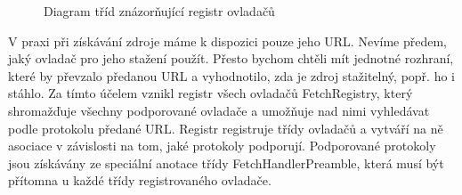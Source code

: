 \begin{figure}[H]
  \begin{center}
    \caption{Diagram tříd znázorňující registr ovladačů}
    \label{Figure.FetchRegistry}
  \end{center}
\end{figure}

V praxi při získávání zdroje máme k dispozici pouze jeho URL. Nevíme předem, jaký ovladač pro jeho stažení použít. Přesto bychom chtěli mít jednotné rozhraní, které by převzalo předanou URL a vyhodnotilo, zda je zdroj stažitelný, popř. ho i stáhlo. Za tímto účelem vznikl registr všech ovladačů FetchRegistry, který shromažďuje všechny podporované ovladače a umožňuje nad nimi vyhledávat podle protokolu předané URL. Registr registruje třídy ovladačů a vytváří na ně asociace v závislosti na tom, jaké protokoly podporují. Podporované protokoly jsou získávány ze speciální anotace třídy FetchHandlerPreamble, která musí být přítomna u každé třídy registrovaného ovladače.

